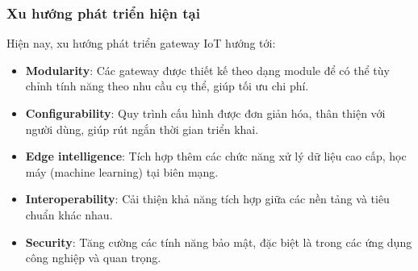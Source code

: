         \subsubsection{Xu hướng phát triển hiện tại}
            Hiện nay, xu hướng phát triển gateway IoT hướng tới:
            \begin{itemize}
                \item \textbf{Modularity}: Các gateway được thiết kế theo dạng module để có thể tùy chỉnh tính năng theo nhu cầu cụ thể, giúp tối ưu chi phí.
                \item \textbf{Configurability}: Quy trình cấu hình được đơn giản hóa, thân thiện với người dùng, giúp rút ngắn thời gian triển khai.
                \item \textbf{Edge intelligence}: Tích hợp thêm các chức năng xử lý dữ liệu cao cấp, học máy (machine learning) tại biên mạng.
                \item \textbf{Interoperability}: Cải thiện khả năng tích hợp giữa các nền tảng và tiêu chuẩn khác nhau.
                \item \textbf{Security}: Tăng cường các tính năng bảo mật, đặc biệt là trong các ứng dụng công nghiệp và quan trọng.
            \end{itemize}
